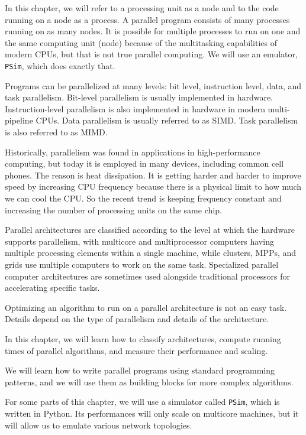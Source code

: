 \documentclass[justified, sixbynine]{tufte-book}
\def\ft{\small\tt}
\theoremstyle{plain}%
\newtheorem * {corollary}{Corollary}
\theoremstyle{definition}
\theoremstyle{remark}
\newtheorem * {remark}{Remark}
\newtheorem * {note}{Note}
\begin{document}
\begin{fullwidth}
In this chapter, we will refer to a processing unit as a node and to the code running on a node as a process. A parallel program consists of many processes running on as many nodes. It is possible for multiple processes to run on one and the same computing unit (node) because of the multitasking capabilities of modern CPUs, but that is not true parallel computing. We will use an emulator, {\ft PSim}, which does exactly that.

Programs can be parallelized at many levels: bit level, instruction level, data, and task parallelism. Bit-level parallelism is usually implemented in hardware. Instruction-level parallelism is also implemented in hardware in modern multi-pipeline CPUs.  Data parallelism is usually referred to as SIMD. Task parallelism is also referred to as MIMD.

Historically, parallelism was found in applications in high-performance computing, but today it is employed in many devices, including common cell phones. The reason is heat dissipation. It is getting harder and harder to improve speed by increasing CPU frequency because there is a physical limit to how much we can cool the CPU. So the recent trend is keeping frequency constant and increasing the number of processing units on the same chip.

Parallel architectures are classified according to the level at which the hardware supports parallelism, with multicore and multiprocessor computers having multiple processing elements within a single machine, while clusters, MPPs, and grids use multiple computers to work on the same task. Specialized parallel computer architectures are sometimes used alongside traditional processors for accelerating specific tasks.

Optimizing an algorithm to run on a parallel architecture is not an easy task. Details depend on the type of parallelism and details of the architecture.

In this chapter, we will learn how to classify architectures, compute running times of parallel algorithms, and measure their performance and scaling.

We will learn how to write parallel programs using standard programming patterns, and we will use them as building blocks for more complex algorithms.

For some parts of this chapter, we will use a simulator called {\ft PSim}, which is written in Python. Its performances will only scale on multicore machines, but it will allow us to emulate various network topologies.


\end{fullwidth}
\end{document}
